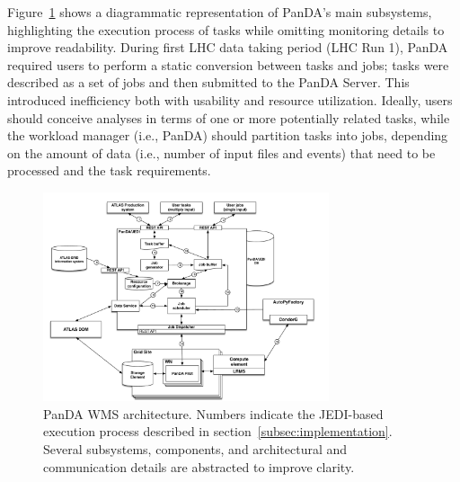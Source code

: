 Figure~\ref{fig:architecture} shows a diagrammatic representation of PanDA's
main subsystems, highlighting the execution process of tasks while omitting
monitoring details to improve readability. During first LHC data taking
period (LHC Run 1), PanDA required users to perform a static conversion
between tasks and jobs; tasks were described as a set of jobs and then
submitted to the PanDA Server. This introduced inefficiency both with
usability and resource utilization. Ideally, users should conceive analyses
in terms of one or more potentially related tasks, while the workload manager
(i.e., PanDA) should partition tasks into jobs, depending on the amount of
data (i.e., number of input files and events) that need to be processed and
the task requirements.

\begin{figure}
  \includegraphics[width=0.75\textwidth]{images/PanDA_WMS.pdf}
  \caption{PanDA WMS architecture. Numbers indicate the JEDI-based execution
           process described in section~\ref{subsec:implementation}. Several
           subsystems, components, and architectural and communication
           details are abstracted to improve
           clarity.}\label{fig:architecture}
\end{figure}

